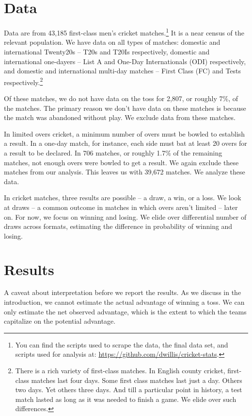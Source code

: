 \documentclass[11pt]{article}
\begin{document}
\section*{Data}
Data are from 43,185 first-class men's cricket matches.\footnote{You can find the scripts used to scrape the data, the final data set, and scripts used for analysis at: \href{https://github.com/dwillis/cricket-stats}{https://github.com/dwillis/cricket-stats}.} It is a near census of the relevant population. We have data on all types of matches: domestic and international Twenty20s -- T20s and T20Is respectively, domestic and international one-dayers -- List A and One-Day Internationals (ODI) respectively, and domestic and international multi-day matches -- First Class (FC) and Tests respectively.\footnote{There is a rich variety of first-class matches. In English county cricket, first-class matches last four days. Some first class matches last just a day. Others two days. Yet others three days. And till a particular point in history, a test match lasted as long as it was needed to finish a game. We elide over such differences.} 

Of these matches, we do not have data on the toss for 2,807, or roughly 7\%, of the matches. The primary reason we don't have data on these matches is because the match was abandoned without play. We exclude data from these matches. 

In limited overs cricket, a minimum number of overs must be bowled to establish a result. In a one-day match, for instance, each side must bat at least 20 overs for a result to be declared. In 706 matches, or roughly 1.7\% of the remaining matches, not enough overs were bowled to get a result. We again exclude these matches from our analysis. This leaves us with 39,672 matches. We analyze these data.

In cricket matches, three results are possible -- a draw, a win, or a loss. We look at draws -- a common outcome in matches in which overs aren't limited -- later on. For now, we focus on winning and losing. We elide over differential number of draws across formats, estimating the difference in probability of winning and losing.  

\section*{Results}
A caveat about interpretation before we report the results. As we discuss in the introduction, we cannot estimate the actual advantage of winning a toss. We can only estimate the net observed advantage, which is the extent to which the teams capitalize on the potential advantage. 
\end{document}
